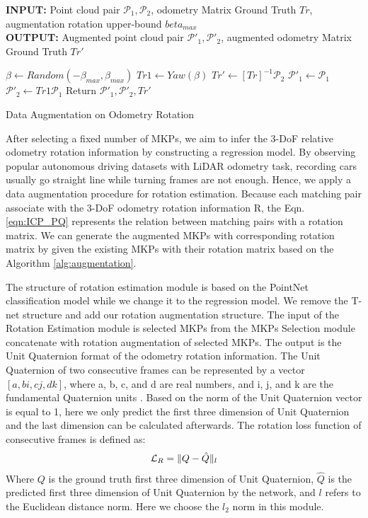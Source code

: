 \documentclass[sigconf]{acmart}
\providecommand{\SetAlgoLined}{\SetLine}
\begin{document}
\begin{algorithm}[t]\footnotesize

	\SetAlgoLined
	\begin{flushleft}
    \textbf{INPUT:} Point cloud pair $\mathcal{P}_1,\mathcal{P}_2$, odometry Matrix Ground Truth $Tr$, augmentation rotation upper-bound $beta_{max}$ \\
	\textbf{OUTPUT:} Augmented point cloud pair $\mathcal{P}'_1,\mathcal{P}'_2$, augmented odometry Matrix Ground Truth $Tr'$ \\ 
	\end{flushleft}
    \begin{algorithmic}
    \State$\beta \leftarrow Random(-\beta_{max},\beta_{max})$
    \State$Tr1 \leftarrow Yaw(\beta)$
    \State$Tr' \leftarrow [Tr]^{-1}\mathcal{P}_2$
    \State$\mathcal{P}'_1 \leftarrow \mathcal{P}_1$
    \State$\mathcal{P}'_2 \leftarrow Tr1 \mathcal{P}_1$
    \State Return $\mathcal{P}'_1,\mathcal{P}'_2,Tr'$
    \end{algorithmic}
	\caption{\footnotesize Data Augmentation on Odometry Rotation}\label{alg:augmentation}

\end{algorithm}
After selecting a fixed number of MKPs, we aim to infer the 3-DoF relative odometry rotation information by constructing a regression model. By observing popular autonomous driving datasets with LiDAR odometry task, recording cars usually go straight line while turning frames are not enough. Hence, we apply a data augmentation procedure for rotation estimation. Because each matching pair associate with the 3-DoF odometry rotation information R, the Eqn. \ref{eqn:ICP_PQ} represents the relation between matching pairs with a rotation matrix. We can generate the augmented MKPs with corresponding rotation matrix by given the existing MKPs with their rotation matrix based on the Algorithm \ref{alg:augmentation}.

The structure of rotation estimation module is based on the PointNet classification model while we change it to the regression model. We remove the T-net structure and add our rotation augmentation structure. The input of the Rotation Estimation module is selected MKPs from the MKPs Selection module concatenate with rotation augmentation of selected MKPs. The output is the Unit Quaternion format of the odometry rotation information. The Unit Quaternion of two consecutive frames can be represented by a vector $[a, bi, cj, dk]$, where a, b, c, and d are real numbers, and i, j, and k are the fundamental Quaternion units \cite{Quaternion}. Based on the norm of the Unit Quaternion vector is equal to 1, here we only predict the first three dimension of Unit Quaternion and the last dimension can be calculated afterwards. 
The rotation loss function of consecutive frames is defined as: 
\begin{align}
\small
    \mathcal{L}_R =\|  Q - \hat{Q} \|_l 
\end{align}
Where $Q$ is the ground truth first three dimension of Unit Quaternion, $\hat{Q}$ is the predicted first three dimension of Unit Quaternion by the network, and $l$ refers to the Euclidean distance norm. Here we choose the $l_2$ norm in this module. 
\end{document}
